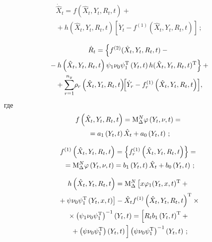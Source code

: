 \begin{multicols}{2}
\noindent
    \begin{multline}
    \dot{\hat X}_t = f \left(\hat X_t, Y_t,R_t,t\right)+{}\\
    {}+
    h\left(\hat X_t,Y_t, R_t,t\right)
   \left[ \dot Y_t - f^{(1)} \left(\hat X_t,Y_t, R_t,t\right)\right]\,;\label{e20-sin}
    \end{multline}


    \vspace*{-12pt}

    \noindent
    \begin{multline}
    \dot R_t=\left\{ f^{(2)}(\hat X_t, Y_t,R_t,t)-{}\right.\\
    \left.{}-h\left(\hat
    X_t, Y_t,R_t,t\right)\psi_1\nu_0\psi_1^{\mathrm{T}} \left(Y_t,t\right)
 h ({\hat X}_t, Y_t,R_t,t)^{\mathrm{T}}\right\} +{}\\
 \hspace*{-1.7mm}{}+\sss_{r=1}^{n_y}\! \rho_r \left(\hat{X}_t,Y_t, R_t,t\right)\!\!\left[
    \dot Y_r -f_r^{(1)}\left({\hat X}_t,Y_t, R_t,t\right) \right]\!,\!\!\!\label{e21-sin}
    \end{multline}
где
    \begin{multline*}
    f\left(\hat X_t, Y_t,R_t,t\right)=
    \mathrm{M}^N_\Delta \vrp \left(Y_t, \nu,t\right)={}\\
     {}=a_1 \left(Y_t, t\right) \hat{X}_t + a_0 \left(Y_t, t\right)\,; %
    \end{multline*}

    \vspace*{-12pt}

    \noindent
    \begin{multline*}
   f^{(1)}\left(\hat X_t, Y_t,R_t,t\right)=\left\{ f_r^{(1)} \left( \hat X_t, Y_t, R_t, t\right)\right\}={}\\
   {}=\mathrm{M}^N_\Delta \varphi \left(Y_t, \nu,t\right)=b_1 \left(Y_t, t\right) \hat{X}_t+ b_0 \left(Y_t, t\right)\,;
   \end{multline*}

\vspace*{-12pt}

\noindent
   \begin{multline*}
    h\left(\hat X_t, Y_t,R_t,t\right)=\mathrm{M}^N_\Delta \left[ x\varphi_1(Y_t,x,t)^{\mathrm{T}} + {}\right.\\
\left.    {}+\psi\nu_0\psi_1^{\mathrm{T}} \left(Y_t,x,t\right)\right]-
    \hat{X}_t f^{(1)}\left(\hat X_t, Y_t,R_t,t\right)^{\mathrm{T}} %
    \times{}\\
{}\times \left(\psi_1\nu_0\psi_1^{\mathrm{T}}\right)^{-1} \left(Y_t,t\right)=
\left[ R_t b_1 \left(Y_t, t\right)^{\mathrm{T}} + {}\right.\\
\left.{}+\left(\psi\nu_0\psi_1^{\mathrm{T}}\right)\left(Y_t, t\right)
\vphantom{\left(Y_t, t\right)^{\mathrm{T}}}
\right] \left(\psi\nu_0\psi_1^{\mathrm{T}}\right)^{-1} \left(Y_t, t\right)\,;
\end{multline*}


\end{multicols}
